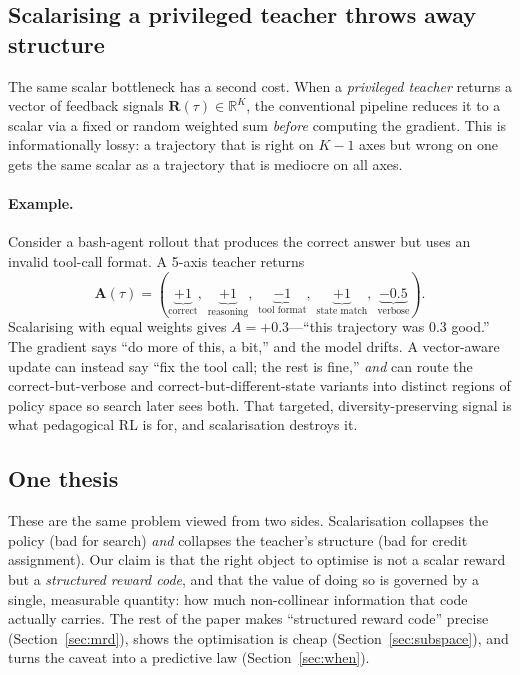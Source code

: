 \documentclass[11pt,a4paper]{article}
\newcommand{\R}{\mathbb{R}}
\begin{document}
\subsection{Scalarising a privileged teacher throws away structure}

The same scalar bottleneck has a second cost.  When a \emph{privileged
teacher} returns a vector of feedback signals $\bm{R}(\tau) \in \R^K$, the
conventional pipeline reduces it to a scalar via a fixed or random weighted
sum \emph{before} computing the gradient.  This is informationally lossy: a
trajectory that is right on $K{-}1$ axes but wrong on one gets the same
scalar as a trajectory that is mediocre on all axes.

\paragraph{Example.}
Consider a bash-agent rollout that produces the correct answer but uses an
invalid tool-call format.  A 5-axis teacher returns
\[
  \bm{A}(\tau) = (\underbrace{+1}_{\text{correct}},\;
                   \underbrace{+1}_{\text{reasoning}},\;
                   \underbrace{-1}_{\text{tool format}},\;
                   \underbrace{+1}_{\text{state match}},\;
                   \underbrace{-0.5}_{\text{verbose}}).
\]
Scalarising with equal weights gives $A = +0.3$---``this trajectory was
$0.3$ good.''  The gradient says ``do more of this, a bit,'' and the model
drifts.  A vector-aware update can instead say ``fix the tool call; the rest
is fine,'' \emph{and} can route the correct-but-verbose and
correct-but-different-state variants into distinct regions of policy space
so search later sees both.  That targeted, diversity-preserving signal is
what pedagogical RL is for, and scalarisation destroys it.

\subsection{One thesis}

These are the same problem viewed from two sides.  Scalarisation collapses
the policy (bad for search) \emph{and} collapses the teacher's structure
(bad for credit assignment).  Our claim is that the right object to
optimise is not a scalar reward but a \emph{structured reward code}, and
that the value of doing so is governed by a single, measurable quantity:
how much non-collinear information that code actually carries.  The rest of
the paper makes ``structured reward code'' precise (Section~\ref{sec:mrd}),
shows the optimisation is cheap (Section~\ref{sec:subspace}), and turns the
caveat into a predictive law (Section~\ref{sec:when}).
\end{document}
